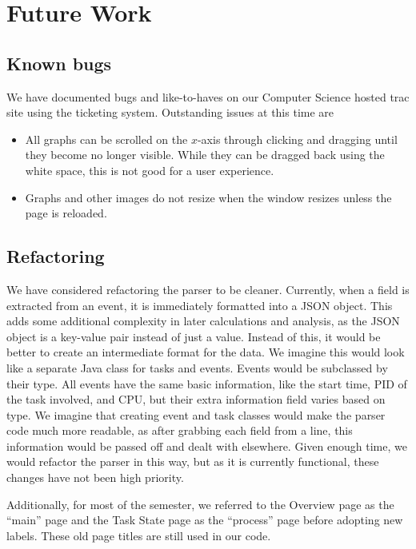 \documentclass{hmcclinic}
\begin{document}
\chapter{Future Work}
\section{Known bugs}

  We have documented bugs and like-to-haves on our Computer Science hosted trac
  site using the ticketing system. Outstanding issues at this time are

  \begin{itemize}
  
  \item All graphs can be scrolled on the $x$-axis through clicking and dragging until they become no longer visible. While
    they can be dragged back using the white space, this is not good for a user
    experience.

  \item Graphs and other images do not resize when the window resizes unless the
    page is reloaded.

\end{itemize}


  \section{Refactoring}

  We have considered refactoring the parser to be cleaner. Currently, when a
  field is extracted from an event, it is immediately formatted into a JSON
  object.  This adds some additional complexity in later calculations and
  analysis, as the JSON object is a key-value pair instead of just a value.
  Instead of this, it would be better to create an intermediate format for the
  data. We imagine this would look like a separate Java class for tasks and
  events. Events would be subclassed by their type. All events have the same
  basic information, like the start time, PID of the task involved, and CPU, but
  their extra information field varies based on type. We imagine that creating
  event and task classes would make the parser code much more readable, as after
  grabbing each field from a line, this information would be passed off and
  dealt with elsewhere. Given enough time, we would refactor the parser in this
  way, but as it is currently functional, these changes have not been high
  priority.

  Additionally, for most of the semester, we referred to the Overview page as
  the ``main'' page and the Task State page as the ``process'' page before
  adopting new labels. These old page titles are still used in our code.
\end{document}

